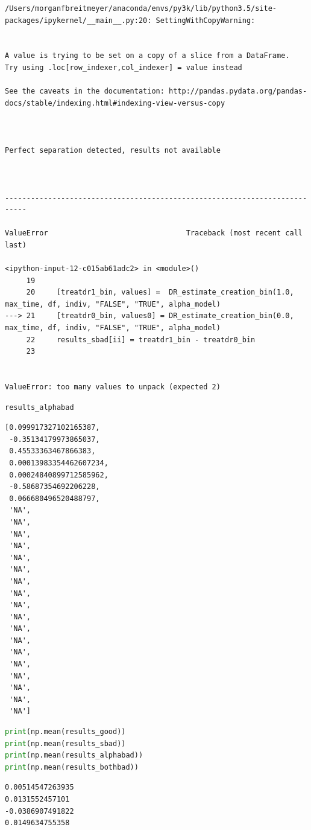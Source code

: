 \begin{lstlisting}
/Users/morganfbreitmeyer/anaconda/envs/py3k/lib/python3.5/site-packages/ipykernel/__main__.py:20: SettingWithCopyWarning:


A value is trying to be set on a copy of a slice from a DataFrame.
Try using .loc[row_indexer,col_indexer] = value instead

See the caveats in the documentation: http://pandas.pydata.org/pandas-docs/stable/indexing.html#indexing-view-versus-copy



Perfect separation detected, results not available



---------------------------------------------------------------------------

ValueError                                Traceback (most recent call last)

<ipython-input-12-c015ab61adc2> in <module>()
     19 
     20     [treatdr1_bin, values] =  DR_estimate_creation_bin(1.0, max_time, df, indiv, "FALSE", "TRUE", alpha_model)
---> 21     [treatdr0_bin, values0] = DR_estimate_creation_bin(0.0, max_time, df, indiv, "FALSE", "TRUE", alpha_model)
     22     results_sbad[ii] = treatdr1_bin - treatdr0_bin
     23 


ValueError: too many values to unpack (expected 2)
\end{lstlisting}

\begin{lstlisting}[language=Python]
results_alphabad
\end{lstlisting}

\begin{lstlisting}
[0.099917327102165387,
 -0.35134179973865037,
 0.45533363467866383,
 0.00013983354462607234,
 0.00024840899712585962,
 -0.58687354692206228,
 0.066680496520488797,
 'NA',
 'NA',
 'NA',
 'NA',
 'NA',
 'NA',
 'NA',
 'NA',
 'NA',
 'NA',
 'NA',
 'NA',
 'NA',
 'NA',
 'NA',
 'NA',
 'NA',
 'NA']
\end{lstlisting}

\begin{lstlisting}[language=Python]
print(np.mean(results_good))
print(np.mean(results_sbad))
print(np.mean(results_alphabad))
print(np.mean(results_bothbad))
\end{lstlisting}

\begin{lstlisting}
0.00514547263935
0.0131552457101
-0.0386907491822
0.0149634755358
\end{lstlisting}

